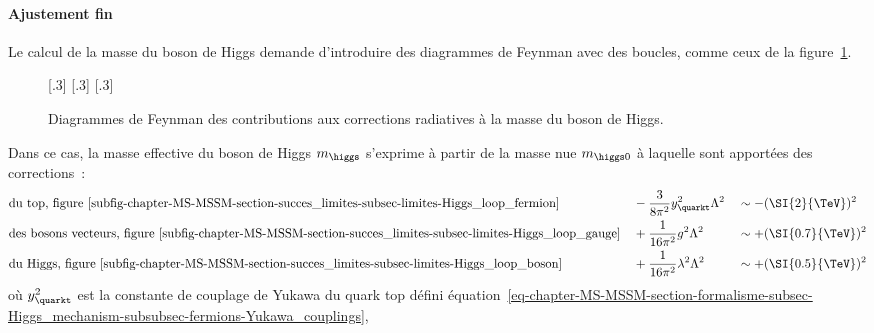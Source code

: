 \paragraph{Ajustement fin}
Le calcul de la masse du boson de Higgs demande d'introduire des diagrammes de Feynman avec des boucles, comme ceux de la figure~\ref{fig-chapter-MS-MSSM-section-succes_limites-subsec-limites-Higgs_loops}.
\begin{figure}[h]
\centering
{}[.3\textwidth]
{}
\hfill
{}[.3\textwidth]
{}
\hfill
{}[.3\textwidth]
{}

\caption[Diagrammes de Feynman des corrections à la masse du boson de Higgs.]{Diagrammes de Feynman des contributions aux corrections radiatives à la masse du boson de Higgs.}
\label{fig-chapter-MS-MSSM-section-succes_limites-subsec-limites-Higgs_loops}
\end{figure}
\par Dans ce cas, la masse effective du boson de Higgs $m_{\higgs}$ s'exprime à partir de la masse \og nue \fg{} $m_{\higgs 0}$ à laquelle sont apportées des corrections~\cite{Nagashima_BSM}:
\begin{align}
\allowdisplaybreaks
& \text{du top, figure~\ref{subfig-chapter-MS-MSSM-section-succes_limites-subsec-limites-Higgs_loop_fermion}} && -\frac{3}{8\pi^2} y_{\quarkt}^2 \Lambda^2 && \sim -(\SI{2}{\TeV})^2 \\
& \text{des bosons vecteurs, figure~\ref{subfig-chapter-MS-MSSM-section-succes_limites-subsec-limites-Higgs_loop_gauge}} && +\frac{1}{16\pi^2} g^2 \Lambda^2 && \sim +(\SI{0.7}{\TeV})^2 \\
& \text{du Higgs, figure~\ref{subfig-chapter-MS-MSSM-section-succes_limites-subsec-limites-Higgs_loop_boson}} && +\frac{1}{16\pi^2} \lambda^2 \Lambda^2 && \sim +(\SI{0.5}{\TeV})^2 \\
\end{align}
où
$y_{\quarkt}^2$ est la constante de couplage de Yukawa du quark top défini équation~\eqref{eq-chapter-MS-MSSM-section-formalisme-subsec-Higgs_mechanism-subsubsec-fermions-Yukawa_couplings},
